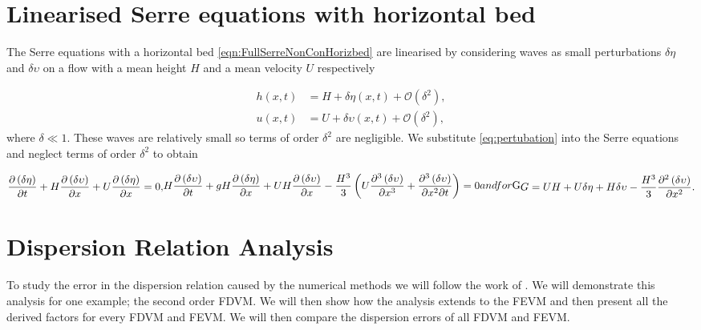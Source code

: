 \section{Linearised Serre equations with horizontal bed}
The Serre equations with a horizontal bed \eqref{eqn:FullSerreNonConHorizbed} are linearised by considering waves as small perturbations $\delta\eta$ and $\delta\upsilon$ on a flow with a mean height $H$ and a mean velocity $U$ respectively

\begin{align}
\label{eq:pertubation}
h(x,t) &= H + \delta \eta(x,t) + \mathcal{O}\left(\delta^2 \right), \\
u(x,t) &= U + \delta \upsilon(x,t) + \mathcal{O}\left(\delta^2 \right),
\end{align}
where $\delta \ll 1$. These waves are relatively small so terms of order $\delta^2$ are negligible. We substitute \eqref{eq:pertubation} into the Serre equations and neglect terms of order $\delta^2$ to obtain

\begin{subequations}
	\begin{gather}
		\label{eqn:LinCont}
		\frac{\partial  \left(\delta\eta \right)}{\partial  t} + H\frac{\partial  \left(\delta\upsilon \right)}{\partial  x} + U\frac{\partial  \left(\delta\eta \right)}{\partial  x}  = 0,
	\end{gather}
	\begin{gather}
	\label{eqn:LineMome}
	H\frac{\partial  \left(\delta\upsilon \right)}{\partial  t} + gH\frac{\partial  \left(\delta\eta \right)}{\partial  x} + UH\frac{\partial  \left(\delta\upsilon \right)}{\partial  x} - \frac{H^3}{3}\left(U\frac{\partial^3  \left(\delta\upsilon \right)}{\partial  x^3} + \frac{\partial^3  \left(\delta\upsilon \right)}{\partial  x^2 \partial  t}  \right)  = 0
	\end{gather}
\label{eqn:LinSerre}	
and for $G$
\begin{gather}
	G = UH + U \delta \eta + H \delta \upsilon -\frac{H^3}{3} \frac{\partial^2 \left(\delta\upsilon \right)}{\partial x^2}.
	\label{eqn:LinConSerreG}
\end{gather}	
\end{subequations}

\section{Dispersion Relation Analysis}
To study the error in the dispersion relation caused by the numerical methods we will follow the work of \cite{Filippini-etal-2016-381}. We will demonstrate this analysis for one example; the second order FDVM. We will then show how the analysis extends to the FEVM and then present all the derived factors for every FDVM and FEVM. We will then compare the dispersion errors of all FDVM and FEVM.

